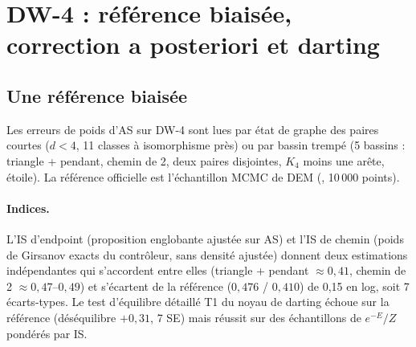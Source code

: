 \section{DW-4 : référence biaisée, correction a posteriori et darting}
\label{sec:dw4}

\subsection{Une référence biaisée}
Les erreurs de poids d'AS sur DW-4 sont lues par état de graphe des paires courtes ($d<4$, 11 classes à isomorphisme près) ou par bassin trempé (5 bassins : triangle + pendant, chemin de 2, deux paires disjointes, $K_4$ moins une arête, étoile). La référence officielle est l'échantillon MCMC de DEM (, 10\,000 points).

\paragraph{Indices.} L'IS d'endpoint (proposition englobante ajustée sur AS) et l'IS de chemin (poids de Girsanov exacts du contrôleur, sans densité ajustée) donnent deux estimations indépendantes qui s'accordent entre elles (triangle + pendant $\approx0{,}41$, chemin de 2 $\approx0{,}47$--$0{,}49$) et s'écartent de la référence ($0{,}476$ / $0{,}410$) de 0,15 en log, soit 7 écarts-types. Le test d'équilibre détaillé T1 du noyau de darting échoue sur la référence (déséquilibre $+0{,}31$, 7 SE) mais réussit sur des échantillons de $e^{-E}/Z$ pondérés par IS.


